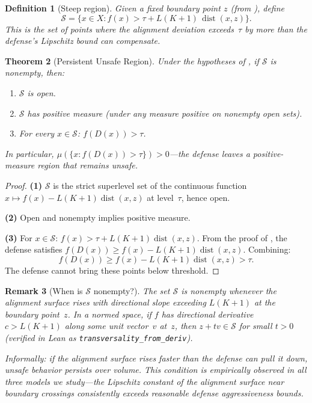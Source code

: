 \documentclass[11pt]{article}
\newtheorem{theorem}{Theorem}[section]
\newtheorem{definition}[theorem]{Definition}
\newtheorem{remark}[theorem]{Remark}
\newcommand{\dist}{\operatorname{dist}}
\begin{document}
\begin{definition}[Steep region]
\label{def:steep}
Given a fixed boundary point $z$ (from ), define
\[
  \mathcal{S} = \{x \in X : f(x) > \tau + L(K+1)\,\dist(x, z)\}.
\]
This is the set of points where the alignment deviation exceeds~$\tau$
by more than the defense's Lipschitz bound can compensate.
\end{definition}

\begin{theorem}[Persistent Unsafe Region]
\label{thm:persistent}
Under the hypotheses of , if $\mathcal{S}$ is
nonempty, then:
\begin{enumerate}[nosep]
  \item $\mathcal{S}$ is open.
  \item $\mathcal{S}$ has positive measure (under any measure positive
    on nonempty open sets).
  \item For every $x \in \mathcal{S}$: $f(D(x)) > \tau$.
\end{enumerate}
In particular, $\mu(\{x : f(D(x)) > \tau\}) > 0$---the defense leaves
a positive-measure region that remains unsafe.
\end{theorem}

\begin{proof}
\textbf{(1)} $\mathcal{S}$ is the strict superlevel set of the
continuous function $x \mapsto f(x) - L(K+1)\dist(x,z)$ at level~$\tau$,
hence open.

\textbf{(2)} Open and nonempty implies positive measure.

\textbf{(3)} For $x \in \mathcal{S}$: $f(x) > \tau + L(K+1)\dist(x,z)$.
From the proof of , the defense satisfies
$f(D(x)) \geq f(x) - L(K+1)\dist(x,z)$. Combining:
\[
  f(D(x)) \geq f(x) - L(K+1)\dist(x,z) > \tau.
\]
The defense cannot bring these points below threshold.
\end{proof}

\begin{remark}[When is $\mathcal{S}$ nonempty?]
\label{rem:transversality}
The set $\mathcal{S}$ is nonempty whenever the alignment surface rises
with directional slope exceeding $L(K+1)$ at the boundary point~$z$.
In a normed space, if $f$ has directional derivative $c > L(K+1)$
along some unit vector~$v$ at~$z$, then $z + tv \in \mathcal{S}$ for
small $t > 0$ (verified in Lean as \texttt{transversality\_from\_deriv}).

Informally: if the alignment surface rises faster than the defense can
pull it down, unsafe behavior persists over volume. This condition is
empirically observed in all three models we study---the Lipschitz
constant of the alignment surface near boundary crossings consistently
exceeds reasonable defense aggressiveness bounds.
\end{remark}
\end{document}
